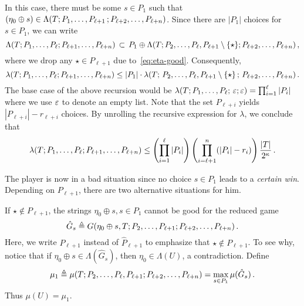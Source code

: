     In this case, 
    there must be some $s \in P_1$ such that 
    $(\eta_0 \oplus s) \in \Lambda(T; P_1, \ldots, P_{\ell+1}\,; P_{\ell+{2}}, \ldots, P_{\ell + n})$.
    Since there are $|P_1|$ choices for $s \in P_1$, 
    we can write
    \[
        \Lambda(T; P_1, \ldots, P_\ell; P_{\ell+1}, \ldots, P_{\ell+n}) \,\subset\, 
        P_1 \oplus \Lambda(T; P_{2}, \ldots, P_{\ell}, P_{\ell + 1} \setminus \{\star\}; P_{\ell+{2}}, \ldots, P_{\ell + n})
        \,,
    \]
    where we drop any $\star \in P_{\ell + 1}$ due to~\eqref{eq:eta-good}. 
    Consequently, 
    \[
        \lambda(T; P_1, \ldots, P_\ell; P_{\ell+1}, \ldots, P_{\ell+n}) 
        \leq |P_1| \cdot \lambda(T;\, P_{2}, \ldots, P_{\ell}, P_{\ell + 1} \setminus \{\star\}\,;\, P_{\ell+{2}}, \ldots, P_{\ell + n})
        \,.
    \]
    The base case of the above recursion would be
    $
        \lambda(T; P_1, \ldots, P_\ell;\, \varepsilon; \varepsilon) = 
            \prod_{i=1}^\ell |P_i| 
    $ 
    where we use $\varepsilon$ to denote an empty list. 
    Note that the set $P_{\ell + i}$ 
    yields $|P_{\ell + i}| - r_{\ell + i}$ choices.
    By unrolling the recursive expression for $\lambda$, we conclude that
    \begin{equation}\label{eq:lambda-expr-lookahead}
        \lambda(T; P_1, \ldots, P_\ell; P_{\ell+1}, \ldots, P_{\ell+n}) 
        \leq 
            \left( \prod_{i=1}^\ell |P_i| \right) 
            \left( \prod_{i=\ell + 1}^n (|P_i| - r_i)\right)
            \frac{|T|}{2^\kappa}
            \,.
    \end{equation}

    The player is now in a bad situation since 
    no choice $s \in P_1$ leads to a \emph{certain win}.
    Depending on $P_{\ell+1}$, 
    there are two alternative situations for him.    
   
    If $\star \not \in P_{\ell + 1}$, 
    the strings $\eta_0 \oplus s, s \in P_1$ 
    cannot be good for the reduced game  
    \[
        \hat{G}_s \triangleq G(\eta_0 \oplus s, T; P_2, \ldots, P_{\ell + 1}; P_{\ell+{2}}, \ldots, P_{\ell + n})
        \,. 
    \]
    Here, we write $P_{\ell + 1}$ instead of $\hat{P}_{\ell + 1}$ 
    to emphasize that $\star \not \in P_{\ell + 1}$. 
    To see why, notice that if $\eta_0 \oplus s \in \Lambda(\hat{G}_s)$, 
    then $\eta_0 \in \Lambda(U)$, a contradiction. 
    Define 
    \[
        \mu_1 \triangleq \mu(T; P_2, \ldots, P_\ell, P_{\ell + 1}; P_{\ell+{2}}, \ldots, P_{\ell + n}) = \max_{s \in P_1} \mu(\hat{G}_s)
        \,.
    \] 
    Thus $\mu(U) = \mu_1$.


